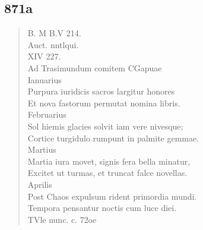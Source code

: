 \documentclass[11pt, a4paper]{report}
\begin{document}
            \subsection*{871a}
      \begin{verse}
      B. M B.V 214. \\ Auct. nntlqui. \\ XIV 227. \\ Ad Trasimundum comitem CGapuae \\ Ianuarius \\ Purpura iuridicis sacros largitur honores \\ Et nova fastorum permutat nomina libris. \\ Februarius \\ Sol hiemis glacies solvit iam vere nivesque; \\ Cortice turgidulo rumpunt in palmite gemmae. \\ Martius \\ Martia iura movet, signis fera bella minatur, \\ Excitet ut turmas, et truncat falce novellas. \\ Aprilis \\ Post Chaos expulsum rident primordia mundi. \\ Tempora pensantur noctis cum luce diei. \\ 
        ﻿\pagebreak 
     \marginpar{[874]} TVle nunc. c. 72oe \\ 
      \end{verse}
  
\end{document}
